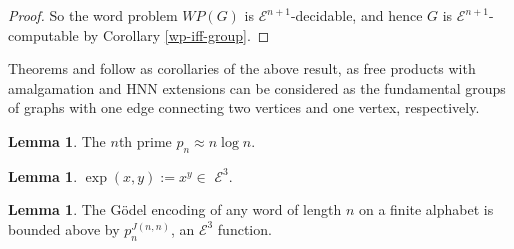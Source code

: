 \documentclass[a4paper]{article}
\newcommand{\grz}[1]{$\mathcal{E}^{#1}$}	%
\theoremstyle{plain}
\theoremstyle{definition}
\newtheorem{lemma}[theorem]{Lemma}
\begin{document}
\begin{proof}
So the word problem $WP(G)$ is \grz{n+1}-decidable, and hence $G$ is \grz{n+1}-computable by Corollary \ref{wp-iff-group}.
\end{proof}

Theorems \cite[4.6]{Cannonito_1973} and \cite[5.3]{Cannonito_1973} follow as corollaries of the above result, as free products with amalgamation and HNN extensions can be considered as the fundamental groups of graphs with one edge connecting two vertices and one vertex, respectively.

\begin{lemma}\label{primedist}
The $n$th prime $p_n \approx n \log n$.
\end{lemma}
\begin{lemma}\label{expine3}
$\exp(x,y) := x^y \in $ \grz{3}.
\end{lemma}
\begin{lemma}\label{godelbound}
The G\"odel encoding of any word of length $n$ on a finite alphabet is bounded above by $p_n^{J(n,n)}$, an \grz{3} function.
\end{lemma}
\end{document}
